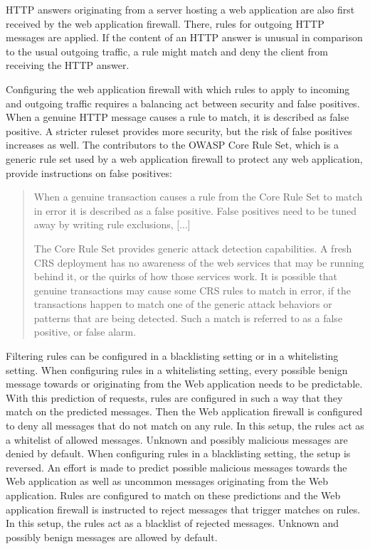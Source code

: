 HTTP answers originating from a server hosting a web application are also first received by the web application firewall.
There, rules for outgoing HTTP messages are applied.
If the content of an HTTP answer is unusual in comparison to the usual outgoing traffic, a rule might match and deny the client from receiving the HTTP answer.

Configuring the web application firewall with which rules to apply to incoming and outgoing traffic requires a balancing act between security and false positives.
When a genuine HTTP message causes a rule to match, it is described as false positive.
A stricter ruleset provides more security, but the risk of false positives increases as well.
The contributors to the OWASP Core Rule Set, which is a generic rule set used by a web application firewall to protect any web application, provide instructions on false positives:

\begin{quote}
	When a genuine transaction causes a rule from the Core Rule Set to match in error it is described as a false positive. False positives need to be tuned away by writing rule exclusions, [...]

	The Core Rule Set provides generic attack detection capabilities. A fresh CRS deployment has no awareness of the web services that may be running behind it, or the quirks of how those services work. It is possible that genuine transactions may cause some CRS rules to match in error, if the transactions happen to match one of the generic attack behaviors or patterns that are being detected. Such a match is referred to as a false positive, or false alarm. \cite{OWASP/crsfpt}
\end{quote}

Filtering rules can be configured in a blacklisting setting or in a whitelisting setting.
When configuring rules in a whitelisting setting, every possible benign message towards or originating from the Web application needs to be predictable. 
With this prediction of requests, rules are configured in such a way that they match on the predicted messages. 
Then the Web application firewall is configured to deny all messages that do not match on any rule. 
In this setup, the rules act as a whitelist of allowed messages. Unknown and possibly malicious messages are denied by default.
When configuring rules in a blacklisting setting, the setup is reversed. 
An effort is made to predict possible malicious messages towards the Web application as well as uncommon messages originating from the Web application.
Rules are configured to match on these predictions and the Web application firewall is instructed to reject messages that trigger matches on rules. 
In this setup, the rules act as a blacklist of rejected messages. Unknown and possibly benign messages are allowed by default.

